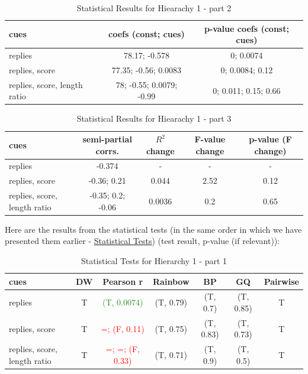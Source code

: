 \documentclass[11pt, oneside]{article}   	%
\begin{document}
\begin{table}[H]
  \begin{center}
  \begin{tabular}{|l|c|c|}
    \hline
    cues & coefs (const; cues) & p-value coefs (const; cues) \\
    \hline
    replies & 78.17; -0.578 & 0; 0.0074 \\
    replies, score & 77.35; -0.56; 0.0083 & 0; 0.0084; 0.12 \\
    replies, score, length ratio & 78; -0.55; 0.0079; -0.99 & 0; 0.011; 0.15; 0.66 \\
    \hline
  \end{tabular}
  \caption{Statistical Results for Hiearachy 1 - part 2}
  \end{center}
\end{table}

\begin{table}[H]
  \begin{center}
  \begin{tabular}{|l|c|c|c|c|}
    \hline
    cues & semi-partial corrs. & $R^2$ change & F-value change & p-value (F change) \\
    \hline
    replies & -0.374 & - & - & - \\
    replies, score & -0.36; 0.21 & 0.044 & 2.52 & 0.12 \\
    replies, score, length ratio & -0.35; 0.2; -0.06 & 0.0036 & 0.2 & 0.65 \\
    \hline
  \end{tabular}
  \caption{Statistical Results for Hiearachy 1 - part 3}
  \end{center}
\end{table}

Here are the results from the statistical tests (in the same order in which we have presented them earlier - \hyperref[list:stat_tests]{Statistical Tests}) (test result, p-value (if relevant)):
\begin{table}[H]
  \begin{center}
  \begin{tabular}{|l|c|c|c|c|c|c|}
    \hline
    cues & DW & Pearson r & Rainbow & BP & GQ & Pairwise \\
    \hline
    replies & T & \textcolor{ForestGreen}{(T, 0.0074)} & (T, 0.79) & (T, 0.7) & (T, 0.85) & T \\
    replies, score & T & \textcolor{red}{=; (F, 0.11)} & (T, 0.75) & (T, 0.83) & (T, 0.73) & T \\
    replies, score, length ratio & T & \textcolor{red}{=; =; (F, 0.33)} & (T, 0.71) & (T, 0.9) & (T, 0.5) & T \\
    \hline
  \end{tabular}
  \caption{Statistical Tests for Hierarchy 1 - part 1}
  \end{center}
\end{table}
\end{document}
